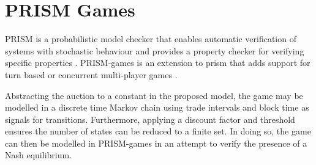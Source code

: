 \section{PRISM Games}

PRISM is a probabilistic model checker that enables automatic verification of systems with stochastic behaviour and provides a property checker for verifying specific properties \cite{prism}. PRISM-games is an extension to prism that adds support for turn based or concurrent multi-player games \cite{prismgames}. 

Abstracting the auction to a constant in the proposed model, the game may be modelled in a discrete time Markov chain using trade intervals and block time as signals for transitions. Furthermore, applying a discount factor and threshold ensures the number of states can be reduced to a finite set. In doing so, the game can then be modelled in PRISM-games in an attempt to verify the presence of a Nash equilibrium. 
